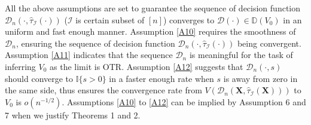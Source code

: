\documentclass[11pt]{article}
\theoremstyle{referenceplain}
\theoremstyle{referencedefinition}
\theoremstyle{referenceremark}
\begin{document}
All the above assumptions are set to guarantee the sequence of decision function $\mathcal{D}_n(\cdot, \widehat{\tau}_{\mathcal{I}}(\cdot))$ ($\mathcal{I}$ is certain subset of $[n]$) converges to $\mathcal{D}(\cdot)\in\mathbb{D}(V_0)$ in an uniform and fast enough manner.  Assumption \ref{A10} requires the smoothness of $\mathcal{D}_n$, ensuring the sequence of decision function $\mathcal{D}_n(\cdot, \widehat{\tau}_{\mathcal{I}}(\cdot))$ being convergent. Assumption \ref{A11} indicates that the sequence $\mathcal{D}_n$ is meaningful for the task of inferring $V_0$ as the limit is OTR. Assumption \ref{A12} suggests that $\mathcal{D}_n(\cdot, s)$ should converge to $\mathbb{I}\{s>0\}$ in a faster enough rate when $s$ is away from zero in the same side, thus ensures the convergence rate from $V(\mathcal{D}_n(\mathbf{X}, \widehat{\tau}_{\mathcal{I}}(\mathbf{X})))$ to $V_0$ is $o(n^{-1/2})$. Assumptions \ref{A10} to \ref{A12} can be implied by Assumption 6 and 7 when we justify Theorems 1 and 2.
\end{document}
